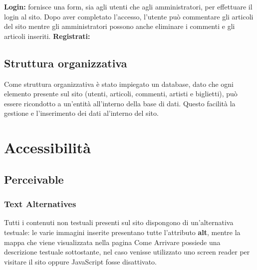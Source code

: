 \documentclass[10pt, a4paper]{article}
\begin{document}
\newline \textbf{Login: }fornisce una form, sia agli utenti che agli amministratori, per effettuare il login al sito. Dopo aver completato l'accesso, l'utente può commentare gli articoli del sito mentre gli amministratori possono anche eliminare i commenti e gli articoli inseriti.
\newline \textbf{Registrati: }
\subsection{Struttura organizzativa}
Come struttura organizzativa è stato impiegato un database, dato che ogni elemento presente sul sito (utenti, articoli, commenti, artisti e biglietti), può essere ricondotto a un'entità all'interno della base di dati. Questo facilità la gestione e l'inserimento dei dati al'interno del sito.
\section{Accessibilità}

\subsection{Perceivable}

\subsubsection{Text Alternatives}
Tutti i contenuti non testuali presenti sul sito dispongono di un'alternativa testuale: le varie immagini inserite presentano tutte l'attributo \textbf{alt}, mentre la mappa che viene visualizzata nella pagina Come Arrivare possiede una descrizione testuale sottostante, nel caso venisse utilizzato uno screen reader per visitare il sito oppure JavaScript fosse disattivato.
\end{document}
